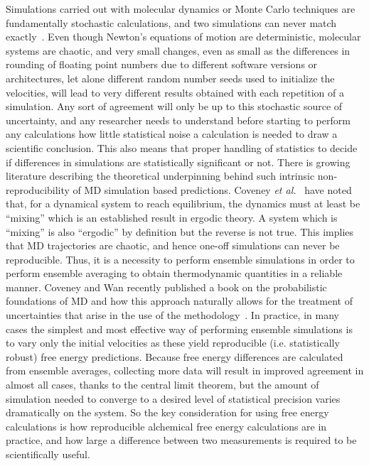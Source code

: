 \documentclass[9pt,bestpractices]{livecoms}
\begin{document}
Simulations carried out with molecular dynamics or Monte Carlo techniques are fundamentally stochastic calculations, and two simulations can never match exactly~\cite{caves1998locally, coveney2016, mdbook2025}.  Even though Newton's equations of motion are deterministic, molecular systems are chaotic, and very small changes, even as small as the  differences in rounding of floating point numbers due to different software versions or architectures, let alone different random number seeds used to initialize the velocities, will lead to very different results obtained with each repetition of a simulation. Any sort of agreement will only be up to this stochastic source of uncertainty, and any researcher needs to understand before starting to perform any calculations how little statistical noise a calculation is needed to draw a scientific conclusion. This also means that proper handling of statistics to decide if differences in simulations are statistically significant or not.  
There is growing literature describing the theoretical underpinning behind such intrinsic non-reproducibility of MD simulation based predictions. Coveney \textit{et al.}~\cite{coveney2016} have noted that, for a  dynamical system to reach equilibrium, the dynamics must at least be ``mixing'' which is an established result in ergodic theory. A system which is ``mixing'' is also ``ergodic'' by definition but the reverse is not true. This implies that MD trajectories are chaotic, and hence one-off simulations can never be reproducible. Thus, it is a necessity to perform ensemble simulations in order to perform ensemble averaging to obtain thermodynamic quantities in a reliable manner. Coveney and Wan recently published a book on the probabilistic foundations of MD and how this approach naturally allows for the treatment of uncertainties that arise in the use of the methodology~\cite{mdbook2025}. In practice, in many cases the simplest and most effective way of performing ensemble simulations is to vary only the initial velocities as these yield reproducible (i.e. statistically robust) free energy predictions. 
Because free energy differences are calculated from ensemble averages, collecting more data will result in improved agreement in almost all cases, thanks to the central limit theorem, but the amount of simulation needed to converge to a desired level of statistical precision varies dramatically on the system. So the key consideration for using free energy calculations is how reproducible alchemical free energy calculations are in practice, and how large a difference between two measurements is required to be scientifically useful.
\end{document}
